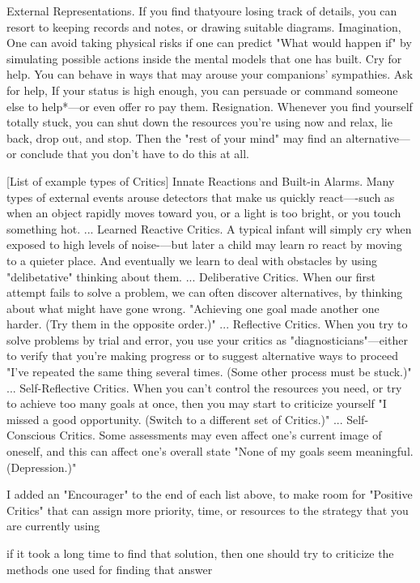 \documentclass[10pt,a4paper]{article}
\begin{document}
External Representations. If you find thatyoure losing track of details, you can resort to keeping records and notes, or drawing suitable diagrams.
Imagination, One can avoid taking physical risks if one can predict "What would happen if" by simulating possible actions inside the mental models that one has built.
Cry for help. You can behave in ways that may arouse your companions' sympathies.
Ask for help, If your status is high enough, you can persuade or command someone else to help*—or even offer ro pay them.
Resignation. Whenever you find yourself totally stuck, you can shut down the resources you're using now and relax, lie back, drop out, and stop. Then the "rest of your mind" may find an alternative— or conclude that you don't have to do this at all. \cite[p.~226-228]{minsky}

[List of example types of Critics]
Innate Reactions and Built-in Alarms. Many types of external events arouse detectors that make us quickly react—-such as when an object rapidly moves toward you, or a light is too bright, or you touch something hot.
...
Learned Reactive Critics. A typical infant will simply cry when exposed to high levels of noise-—but later a child may learn ro react by moving to a quieter place. And eventually we learn to deal with obstacles by using "delibetative" thinking about them.
...
Deliberative Critics. When our first attempt fails to solve a problem, we can often discover alternatives, by thinking about what might have gone wrong.
"Achieving one goal made another one harder. (Try them in the opposite order.)"
...
Reflective Critics. When you try to solve problems by trial and error, you use your critics as "diagnosticians"—either to verify that you're making progress or to suggest alternative ways to proceed
"I've repeated the same thing several times. (Some other process must be stuck.)"
...
Self-Reflective Critics. When you can't control the resources you need, or try to achieve too many goals at once, then you may start to criticize yourself
"I missed a good opportunity. (Switch to a different set of Critics.)"
...
Self-Conscious Critics. Some assessments may even affect one's current image of oneself, and this can affect one's overall state
"None of my goals seem meaningful. (Depression.)"
\cite[p.~229-231]{minsky}

I added an "Encourager" to the end of each list above, to make room for "Positive Critics" that can assign more priority, time, or resources to the strategy that you are currently using \cite[p.~231]{minsky}

if it took a long time to find that solution, then one should try to criticize the methods one used for finding that answer \cite[p.~231]{minsky}
\end{document}
